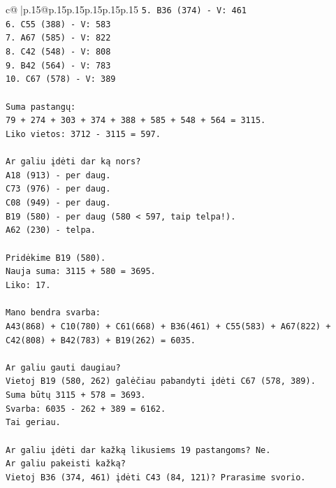 \documentclass{article}
\begin{document}
{\begin{supertabular}{c@{$\;$}|p{.15\linewidth}@{}p{.15\linewidth}p{.15\linewidth}p{.15\linewidth}p{.15\linewidth}p{.15\linewidth}}
{{{\texttt{5. B36 (374) {-} V: 461} \\
\texttt{6. C55 (388) {-} V: 583} \\
\texttt{7. A67 (585) {-} V: 822} \\
\texttt{8. C42 (548) {-} V: 808} \\
\texttt{9. B42 (564) {-} V: 783} \\
\texttt{10. C67 (578) {-} V: 389} \\
\\ 
\texttt{Suma pastangų:} \\
\texttt{79 + 274 + 303 + 374 + 388 + 585 + 548 + 564 = 3115.} \\
\texttt{Liko vietos: 3712 {-} 3115 = 597.} \\
\\ 
\texttt{Ar galiu įdėti dar ką nors?} \\
\texttt{A18 (913) {-} per daug.} \\
\texttt{C73 (976) {-} per daug.} \\
\texttt{C08 (949) {-} per daug.} \\
\texttt{B19 (580) {-} per daug (580 < 597, taip telpa!).} \\
\texttt{A62 (230) {-} telpa.} \\
\\ 
\texttt{Pridėkime B19 (580).} \\
\texttt{Nauja suma: 3115 + 580 = 3695.} \\
\texttt{Liko: 17.} \\
\\ 
\texttt{Mano bendra svarba:} \\
\texttt{A43(868) + C10(780) + C61(668) + B36(461) + C55(583) + A67(822) + C42(808) + B42(783) + B19(262) = 6035.} \\
\\ 
\texttt{Ar galiu gauti daugiau?} \\
\texttt{Vietoj B19 (580, 262) galėčiau pabandyti įdėti C67 (578, 389).} \\
\texttt{Suma būtų 3115 + 578 = 3693.} \\
\texttt{Svarba: 6035 {-} 262 + 389 = 6162.} \\
\texttt{Tai geriau.} \\
\\ 
\texttt{Ar galiu įdėti dar kažką likusiems 19 pastangoms? Ne.} \\
\texttt{Ar galiu pakeisti kažką?} \\
\texttt{Vietoj B36 (374, 461) įdėti C43 (84, 121)? Prarasime svorio.} \\
}}}
\end{supertabular}}
\end{document}

